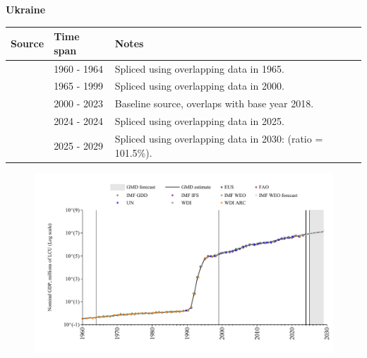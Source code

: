 \documentclass[12pt,a4paper,landscape]{article}
\begin{document}
\begin{adjustbox}{max totalsize={\paperwidth}{\paperheight},center}
\begin{minipage}[t][\textheight][t]{\textwidth}
\vspace*{0.5cm}
{}
\begin{center}
{\Large\bfseries Ukraine}
\end{center}
\vspace{0.5cm}
\begin{table}[H]
\centering
\small
\begin{tabular}{|l|l|l|}
\hline
\textbf{Source} & \textbf{Time span} & \textbf{Notes} \\
\hline
\rowcolor{white}\cite{WDI_ARC}& 1960 - 1964 &Spliced using overlapping data in 1965.\\
\rowcolor{lightgray}\cite{WDI}& 1965 - 1999 &Spliced using overlapping data in 2000.\\
\rowcolor{white}\cite{EUS}& 2000 - 2023 &Baseline source, overlaps with base year 2018.\\
\rowcolor{lightgray}\cite{IMF_IFS}& 2024 - 2024 &Spliced using overlapping data in 2025.\\
\rowcolor{white}\cite{IMF_WEO_forecast}& 2025 - 2029 &Spliced using overlapping data in 2030: (ratio = 101.5\%).\\
\hline
\end{tabular}
\end{table}
\begin{figure}[H]
\centering
\includegraphics[width=\textwidth,height=0.6\textheight,keepaspectratio]{graphs/UKR_nGDP.pdf}
\end{figure}
\end{minipage}
\end{adjustbox}
\end{document}
